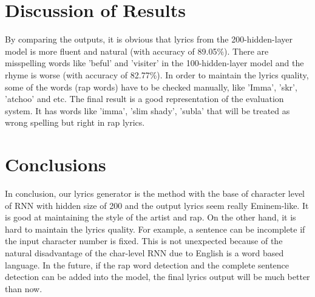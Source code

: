 \documentclass[11pt,a4paper]{article}
\begin{document}
\section{Discussion of Results}
By comparing the outputs, it is obvious that lyrics from the 200-hidden-layer model is more fluent and natural (with accuracy of 89.05\%). There are misspelling words like 'beful' and 'visiter' in the 100-hidden-layer model and the rhyme is worse (with accuracy of 82.77\%). In order to maintain the lyrics quality, some of the words (rap words) have to be checked manually, like 'Imma', 'skr', 'atchoo' and etc. The final result is a good representation of the evaluation system. It has words like 'imma', 'slim shady', 'subla' that will be treated as wrong spelling but right in rap lyrics. 

\section{Conclusions}
In conclusion, our lyrics generator is the method with the base of character level of RNN with hidden size of 200 and the output lyrics seem really Eminem-like. It is good at maintaining the style of the artist and rap. On the other hand, it is hard to maintain the lyrics quality. For example, a sentence can be incomplete if the input character number is fixed. This is not unexpected because of the natural disadvantage of the char-level RNN due to English is a word based language. In the future, if the rap word detection and the complete sentence detection can be added into the model, the final lyrics output will be much better than now. 




\end{document}
